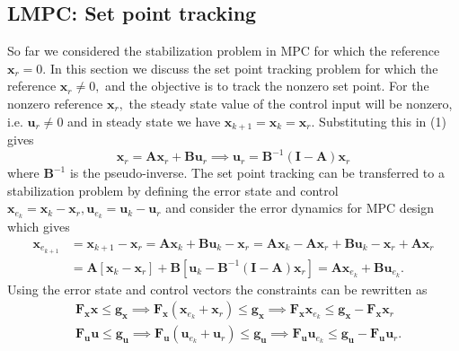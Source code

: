 \documentclass{article}
\begin{document}
\subsection{LMPC: Set point tracking}
So far we considered the stabilization problem in MPC for which the reference $\textbf{x}_{r}=0.$ In this section we discuss the set point tracking problem for which the reference $\textbf{x}_{r}\neq 0,$ and the objective is to track the nonzero set point. For the nonzero reference $\textbf{x}_{r},$ the steady state value of the control input will be nonzero, i.e. $\textbf{u}_{r}\neq 0$ and in steady state we have $\textbf{x}_{k+1}=\textbf{x}_{k}=\textbf{x}_{r}.$ Substituting this in (1) gives 
\begin{equation}
    \textbf{x}_{r}=\textbf{A}\textbf{x}_{r}+\textbf{B}\textbf{u}_{r}
    \implies  \textbf{u}_{r}=\textbf{B}^{-1}(\textbf{I}-\textbf{A})\textbf{x}_{r}
\end{equation}
where $\textbf{B}^{-1}$ is the pseudo-inverse.
The set point tracking can be transferred to a stabilization problem by defining the error state and control $\textbf{x}_{e_k}=\textbf{x}_{k}-\textbf{x}_{r},\textbf{u}_{e_k}=\textbf{u}_{k}-\textbf{u}_{r}$ and consider the error dynamics for MPC design which gives
\begin{equation}
    \begin{aligned}
    \textbf{x}_{e_{k+1}}&=\textbf{x}_{k+1}-\textbf{x}_{r}=\textbf{A}\textbf{x}_{k}+\textbf{B}\textbf{u}_{k}-\textbf{x}_{r}=\textbf{A}\textbf{x}_{k}-\textbf{A}\textbf{x}_{r}+\textbf{B}\textbf{u}_{k}-\textbf{x}_{r}+\textbf{A}\textbf{x}_{r}\\
    &=\textbf{A}[\textbf{x}_{k}-\textbf{x}_{r}]+\textbf{B}[\textbf{u}_{k}-\textbf{B}^{-1}(\textbf{I}-\textbf{A})\textbf{x}_{r}]=\textbf{A}\textbf{x}_{e_k}+\textbf{B}\textbf{u}_{e_k}.
    \end{aligned}
\end{equation}
Using the error state and control vectors the constraints can be rewritten as
\begin{equation}
\begin{aligned}
  & \textbf{F}_{\textbf{x}}\textbf{x} \leq \textbf{g}_{\textbf{x}}\implies \textbf{F}_{\textbf{x}}(\textbf{x}_{e_k}+\textbf{x}_{r}) \leq \textbf{g}_{\textbf{x}} \implies \textbf{F}_{\textbf{x}}\textbf{x}_{e_k} \leq \textbf{g}_{\textbf{x}}-\textbf{F}_{\textbf{x}}\textbf{x}_{r}  \\
  & \textbf{F}_{\textbf{u}}\textbf{u} \leq \textbf{g}_{\textbf{u}} \implies \textbf{F}_{\textbf{u}}(\textbf{u}_{e_k}+\textbf{u}_{r}) \leq \textbf{g}_{\textbf{u}} \implies  \textbf{F}_{\textbf{u}}\textbf{u}_{e_k} \leq \textbf{g}_{\textbf{u}}-\textbf{F}_{\textbf{u}}\textbf{u}_{r}.
  \end{aligned} 
\end{equation}
\end{document}
